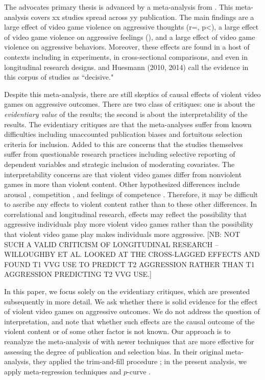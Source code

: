 \documentclass[man]{apa6}
\begin{document}
The advocates primary thesis is advanced by a meta-analysis from \citep{Anderson:etal:2010}.  This meta-analysis covers xx studies spread across yy publication.  The main findings are a large effect of video game violence on aggressive thoughts (r=, p<), a large effect of video game violence on aggressive feelings (), and a large effect of video game violence on aggressive behaviors.  Moreover, these effects are found in a host of contexts including in experiments, in cross-sectional comparisons, and even in longitudinal research designs. \citet{Bushman:etal:2010} and Huesmann (2010, 2014) call the evidence in this corpus of studies as ``decisive."

Despite this meta-analysis, there are still skeptics of causal effects of violent video games on aggressive outcomes.  There are two class of critiques: one is about the {\em evidentiary value} of the results; the second is about the interpretability of the results.   The evidentiary critiques are that the meta-analyses suffer from known difficulties including unaccounted publication biases and fortuitous selection criteria for inclusion.  Added to this are concerns that the studies themselves suffer from questionable research practices including selective reporting of dependent variables and strategic inclusion of moderating covariates.   The interpretability concerns are that violent video games differ from nonviolent games in more than violent content.  Other hypothesized differences include arousal \citep{Elson:etal:2013}, competition \citep{Adachi:Willoughby:2011}, and feelings of competence \citep{Przybylski:etal:2014}.  Therefore, it may be difficult to ascribe any effects to violent content rather than to these other differences. In correlational and longitudinal research, effects may reflect the possibility that aggressive individuals play more violent video games rather than the possibility that violent video game play makes individuals more aggressive. [NB: NOT SUCH A VALID CRITICISM OF LONGITUDINAL RESEARCH -- WILLOUGHBY ET AL. LOOKED AT THE CROSS-LAGGED EFFECTS AND FOUND T1 VVG USE TO PREDICT T2 AGGRESSION RATHER THAN T1 AGGRESSION PREDICTING T2 VVG USE.]

In this paper, we focus solely on the evidentiary critiques, which are presented subsequently in more detail.  We ask whether there is solid evidence for the effect of violent video games on aggressive outcomes.  We do not address the question of interpretation, and note that whether such effects are the causal outcome of the violent content or of some other factor is not known. Our approach is to reanalyze the meta-analysis of \citet{Anderson:etal:2010} with newer techniques that are more effective for assessing the degree of publication and selection bias. In their original meta-analysis, they applied the trim-and-fill procedure \citep{Duval:Tweedie:2000}; in the present analysis, we apply meta-regression techniques \citep{Egger:1997,Stanley:Doucouliagos:2014} and $p$-curve \citep{Simonsohn:etal:2014}. %
\end{document}
